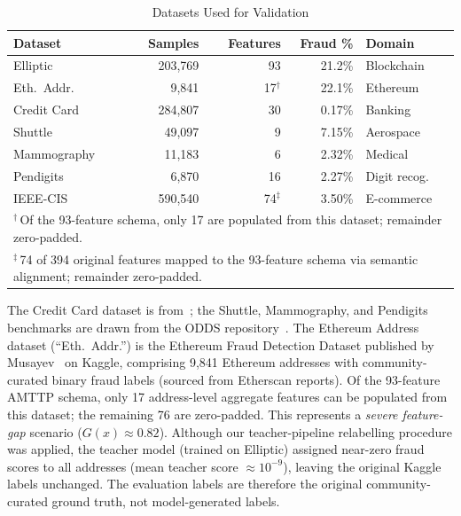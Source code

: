 \documentclass[journal]{IEEEtran}
\begin{document}
\begin{table}[!t]
\centering
\caption{Datasets Used for Validation}
\label{tab:datasets}
\begin{tabular}{@{}lrrrl@{}}
\toprule
\textbf{Dataset} & \textbf{Samples} & \textbf{Features} & \textbf{Fraud \%} & \textbf{Domain} \\
\midrule
Elliptic      & 203{,}769 & 93  & 21.2\% & Blockchain \\
Eth.\ Addr.   & 9{,}841   & 17$^\dagger$  & 22.1\% & Ethereum \\
Credit Card   & 284{,}807 & 30  & 0.17\% & Banking \\
Shuttle       & 49{,}097  & 9   & 7.15\% & Aerospace \\
Mammography   & 11{,}183  & 6   & 2.32\% & Medical \\
Pendigits     & 6{,}870   & 16  & 2.27\% & Digit recog. \\
IEEE-CIS      & 590{,}540 & 74$^\ddagger$ & 3.50\% & E-commerce \\
\bottomrule
\multicolumn{5}{l}{\footnotesize $^\dagger$\,Of the 93-feature schema, only 17 are populated from this dataset; remainder zero-padded.}\\
\multicolumn{5}{l}{\footnotesize $^\ddagger$\,74 of 394 original features mapped to the 93-feature schema via semantic alignment; remainder zero-padded.}
\end{tabular}
\end{table}

The Credit Card dataset is from~\cite{dalpozzolo2015}; the Shuttle, Mammography, and Pendigits benchmarks are drawn from the ODDS repository~\cite{rayana2016}. The Ethereum Address dataset (``Eth.\ Addr.'') is the Ethereum Fraud Detection Dataset published by Musayev~\cite{musayev2022ethfraud} on Kaggle, comprising 9{,}841 Ethereum addresses with community-curated binary fraud labels (sourced from Etherscan reports). Of the 93-feature AMTTP schema, only 17 address-level aggregate features can be populated from this dataset; the remaining 76 are zero-padded. This represents a \emph{severe feature-gap} scenario ($G(x) \approx 0.82$). Although our teacher-pipeline relabelling procedure was applied, the teacher model (trained on Elliptic) assigned near-zero fraud scores to all addresses (mean teacher score $\approx 10^{-9}$), leaving the original Kaggle labels unchanged. The evaluation labels are therefore the original community-curated ground truth, not model-generated labels.
\end{document}
